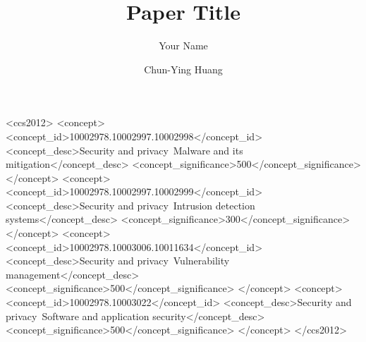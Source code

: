 \documentclass[acmlarge]{acmart}
\begin{document}
\title{Paper Title}

\iffalse
\author{Anonymous Authors}
\authornotemark[1]
\email{anonymous@institution.com}
\affiliation{%
  \institution{Anonymous Institution}
  \city{Anonymous City}
  \country{Anonymous Country}
}
\fi

\author{Your Name}
\authornotemark[1]

\author{Chun-Ying Huang}
\authornotemark[1]

\begin{CCSXML}
<ccs2012>
<concept>
<concept_id>10002978.10002997.10002998</concept_id>
<concept_desc>Security and privacy~Malware and its mitigation</concept_desc>
<concept_significance>500</concept_significance>
</concept>
<concept>
<concept_id>10002978.10002997.10002999</concept_id>
<concept_desc>Security and privacy~Intrusion detection systems</concept_desc>
<concept_significance>300</concept_significance>
</concept>
<concept>
<concept_id>10002978.10003006.10011634</concept_id>
<concept_desc>Security and privacy~Vulnerability management</concept_desc>
<concept_significance>500</concept_significance>
</concept>
<concept>
<concept_id>10002978.10003022</concept_id>
<concept_desc>Security and privacy~Software and application security</concept_desc>
<concept_significance>500</concept_significance>
</concept>
</ccs2012>
\end{CCSXML}


\begin{abstract}

\end{abstract}


\maketitle





\end{document}

